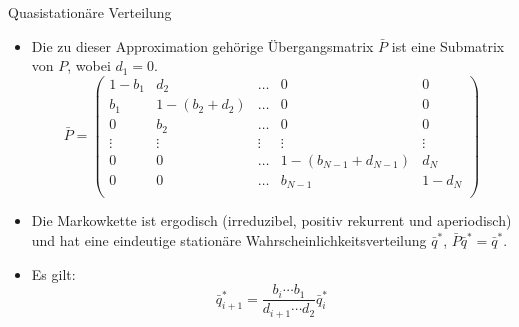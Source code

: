 \documentclass{beamer}
\begin{document}
\begin{frame}{Quasistationäre Verteilung}
  \begin{itemize}
  \item Die zu dieser Approximation gehörige Übergangsmatrix $\bar{P}$ ist eine Submatrix von $P$, wobei $d_1 = 0$.
      \[
      \bar{P} = \begin{pmatrix}
        1-b_1 & d_2 & \dots & 0 & 0 \\
        b_1 & 1 - (b_2 + d_2) &  \dots & 0 & 0 \\
        0 & b_2 & \dots & 0 & 0 \\
        \vdots & \vdots & \vdots & \vdots & \vdots \\
        0 & 0  &  \dots & 1 - (b_{N-1} + d_{N-1}) & d_N \\
        0 & 0  &  \dots & b_{N-1} & 1 - d_N \\
      \end{pmatrix}
    \]
  \item Die Markowkette ist ergodisch (irreduzibel, positiv rekurrent und aperiodisch) und hat eine eindeutige stationäre Wahrscheinlichkeitsverteilung $\bar{q}^*$, $\bar{P}\bar{q}^* = \bar{q}^*$.
  \item Es gilt:
    \[
      \bar{q}^*_{i+1} = \frac{b_i \cdots b_1}{d_{i+1}\cdots d_2}\bar{q}^*_{i}
    \]
  \end{itemize}
\end{frame}
\end{document}

